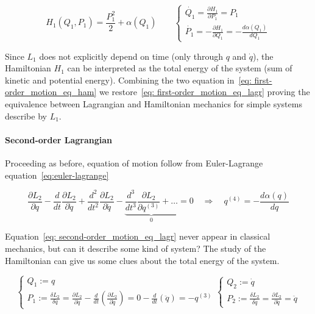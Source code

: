 \begin{equation} \label{eq: first-order_motion_eq_ham}
  H_1(Q_1, P_1) = \frac{P_1^2}{2} + \alpha(Q_1) \qquad
  \begin{cases}
    \dot{Q_1} =   \frac{\partial H_1}{\partial P_1} = P_1 \\
    \dot{P_1} = - \frac{\partial H_1}{\partial Q_1} = - \frac{d\alpha(Q_1)}{dQ_1}
  \end{cases}
\end{equation}

Since $L_1$ does not explicitly depend on time (only through $q$ and $\dot{q}$),
the Hamiltonian $H_1$ can be interpreted as the total energy of the system (sum
of kinetic and potential energy). Combining the two equation in~\eqref{eq:
first-order_motion_eq_ham} we restore~\eqref{eq: first-order_motion_eq_lagr}
proving the equivalence between Lagrangian and Hamiltonian mechanics for simple
systems describe by $L_1$.


\paragraph{Second-order Lagrangian} Proceeding as before, equation of motion
follow from Euler-Lagrange equation~\eqref{eq:euler-lagrange}

\begin{equation} \label{eq: second-order_motion_eq_lagr}
  \frac{\partial L_2}{\partial q} -
  \frac{d}{dt}\frac{\partial L_2}{\partial \dot{q}} +
  \frac{d^2}{dt^2}\frac{\partial L_2}{\partial \ddot{q}} -
  \underbrace{
    \frac{d^3}{dt^3}\frac{\partial L_2}{\partial q^{(3)}} + \ldots
  }_0 = 0
  \quad \Rightarrow \quad
  q^{(4)} = - \frac{d\alpha(q)}{dq}
\end{equation}

Equation~\eqref{eq: second-order_motion_eq_lagr} never appear in classical
mechanics, but can it describe some kind of system? The study of the Hamiltonian
can give us some clues about the total energy of the system.

\begin{equation*}
  \begin{cases}
    Q_1 := q \\
    P_1 := \frac{\delta L_2}{\delta \dot{q}}
         = \frac{\partial L_2}{\partial \dot{q}} -
           \frac{d}{dt} \left( \frac{\partial L_2}{\partial \ddot{q}} \right)
         = 0 - \frac{d}{dt} \left( \ddot{q} \right) = -q^{(3)}
  \end{cases}
  \begin{cases}
    Q_2 := \dot{q} \\
    P_2 := \frac{\delta L_2}{\delta \ddot{q}}
         = \frac{\partial L_2}{\partial \ddot{q}} = \ddot{q}
  \end{cases}
\end{equation*}

